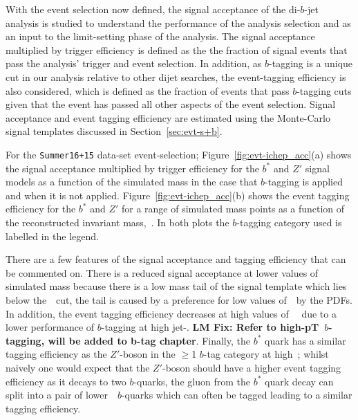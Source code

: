 With the event selection now defined,
the signal acceptance of the di-$b$-jet analysis is studied
to understand the performance of the analysis selection
and as an input to the limit-setting phase of the analysis.
The signal acceptance multiplied by trigger efficiency is defined as the 
the fraction of signal events that pass the analysis' trigger and event selection.
In addition, as $b$-tagging is a unique cut in our analysis relative to other dijet searches,
the event-tagging efficiency is also considered, which is defined as the fraction of events that pass
$b$-tagging cuts given that the event has passed all other aspects of the event selection.
Signal acceptance and event tagging efficiency are estimated using the
Monte-Carlo signal templates discussed in Section~\ref{sec:evt-s+b}.

For the \verb|Summer16+15| data-set event-selection;
Figure~\ref{fig:evt-ichep_acc}(a) shows the signal acceptance multiplied by trigger efficiency
for the $b^*$ and $Z'$ signal models
as a function of the simulated mass
in the case that $b$-tagging is applied and when it is not applied.
Figure~\ref{fig:evt-ichep_acc}(b) shows the event tagging efficiency
for the $b^*$ and $Z'$ for a range of simulated mass points
as a function of the reconstructed invariant mass,~\mjj.
In both plots the $b$-tagging category used is labelled in the legend.

There are a few features of the signal acceptance and tagging efficiency that can be commented on.
There is a reduced signal acceptance at lower values of simulated mass
because there is a low mass tail of the signal template which lies below the~\mjj~cut,
the tail is caused by a preference for low values of~\mjj~by the PDFs.
In addition, the event tagging efficiency decreases at high values of~\mjj~
due to a lower performance of $b$-tagging at high jet-\pT.
\textbf{LM Fix: Refer to high-pT~$b$-tagging, will be added to b-tag chapter}.
Finally, the $b^*$ quark has a similar tagging efficiency
as the $Z'$-boson in the $\geq$1 $b$-tag category at high~\mjj;
whilst naively one would expect that the $Z'$-boson should have a higher
event tagging efficiency as it decays to two $b$-quarks,
the gluon from the $b^*$ quark decay can split into a pair of lower~\pT~$b$-quarks
which can often be tagged leading to a similar tagging efficiency.

